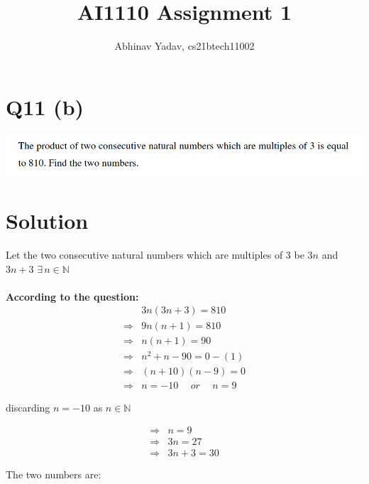 \documentclass[11pt, a4paper]{article}
\title{AI1110 Assignment 1}
\author{Abhinav Yadav, cs21btech11002}
\begin{document}
    \maketitle
    \section*{Q11 (b)}
    \includegraphics[width=\textwidth]{q11_b.png}
    \section*{Solution}
    Let the two consecutive natural numbers which are multiples of $3$ be $3n$ and $3n+3$
    \hspace{5pt} $\exists \hspace{2pt} n \in \mathbb{N}$\\\\
    \textbf{According to the question:}
    \begin{align*}
        & 3n(3n+3) = 810\\
        \Rightarrow & 9n(n+1)=810\\
        \Rightarrow & n(n+1)=90\\
        \Rightarrow & n^2+n-90=0\hspace{0pt} -(1)\\
        \Rightarrow & (n+10)(n-9)=0\\
        \Rightarrow & n=-10 \hspace{15pt} or \hspace{15pt} n=9
    \end{align*}
    \begin{center}
        discarding $n=-10$ as $n \in \mathbb{N}$
    \end{center}
    \begin{equation*}
        \begin{split}
            \Rightarrow & n=9\\
            \Rightarrow & 3n=27\\
            \Rightarrow & 3n+3=30\\\\
        \end{split}
    \end{equation*} 
    The two numbers are:\\
    \pagebreak
\end{document}
